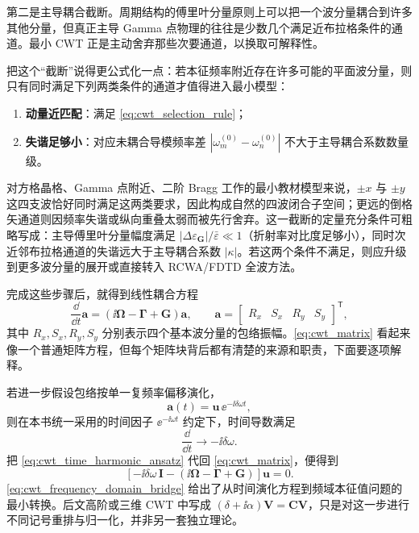 第二是主导耦合截断。周期结构的傅里叶分量原则上可以把一个波分量耦合到许多其他分量，但真正主导 Gamma 点物理的往往是少数几个满足近布拉格条件的通道。最小 CWT 正是主动舍弃那些次要通道，以换取可解释性。

把这个“截断”说得更公式化一点：若本征频率附近存在许多可能的平面波分量，则只有同时满足下列两类条件的通道才值得进入最小模型：
\begin{enumerate}
  \item \textbf{动量近匹配}：满足 \cref{eq:cwt_selection_rule}；
  \item \textbf{失谐足够小}：对应未耦合导模频率差 $|\omega_m^{(0)}-\omega_n^{(0)}|$ 不大于主导耦合系数数量级。
\end{enumerate}
对方格晶格、Gamma 点附近、二阶 Bragg 工作的最小教材模型来说，$\pm x$ 与 $\pm y$ 这四支波恰好同时满足这两类要求，因此构成自然的四波闭合子空间；更远的倒格矢通道则因频率失谐或纵向重叠太弱而被先行舍弃。这一截断的定量充分条件可粗略写成：主导傅里叶分量幅度满足 $|\Delta\varepsilon_{\mathbf{G}}|/\bar{\varepsilon}\ll 1$（折射率对比度足够小），同时次近邻布拉格通道的失谐远大于主导耦合系数 $|\kappa|$。若这两个条件不满足，则应升级到更多波分量的展开或直接转入 RCWA/FDTD 全波方法。

完成这些步骤后，就得到线性耦合方程
\begin{equation}
\frac{\dd}{\dd t}\bm{a}
=
\left(\ii\bm{\Omega}-\bm{\Gamma}+\bm{G}\right)\bm{a},
\qquad
\bm{a}=
\begin{bmatrix}
R_x & S_x & R_y & S_y
\end{bmatrix}^{\mathsf T},
\label{eq:cwt_matrix}
\end{equation}
其中 $R_x,S_x,R_y,S_y$ 分别表示四个基本波分量的包络振幅。\cref{eq:cwt_matrix} 看起来像一个普通矩阵方程，但每个矩阵块背后都有清楚的来源和职责，下面要逐项解释。

若进一步假设包络按单一复频率偏移演化，
\begin{equation}
\bm a(t)=\bm u\,\ee^{-\ii\delta\omega t},
\label{eq:cwt_time_harmonic_ansatz}
\end{equation}
则在本书统一采用的时间因子 $\ee^{-\ii\omega t}$ 约定下，时间导数满足
\[
\frac{\dd}{\dd t}\rightarrow -\ii\delta\omega.
\]
把 \cref{eq:cwt_time_harmonic_ansatz} 代回 \cref{eq:cwt_matrix}，便得到
\begin{equation}
\left[
-\ii\delta\omega\,\bm I
-\left(\ii\bm{\Omega}-\bm{\Gamma}+\bm{G}\right)
\right]\bm u=0.
\label{eq:cwt_frequency_domain_bridge}
\end{equation}
\cref{eq:cwt_frequency_domain_bridge} 给出了从时间演化方程到频域本征值问题的最小转换。后文高阶或三维 CWT 中写成 $(\delta+\ii\alpha)\bm V=\bm C\bm V$，只是对这一步进行不同记号重排与归一化，并非另一套独立理论。

